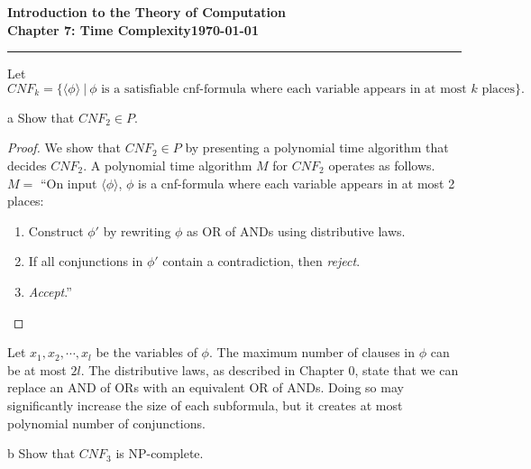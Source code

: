 \documentclass[11pt]{article}
\newcommand{\dated}{\today}
\begin{document}
\textbf{Introduction to the Theory of
Computation}\hfill\textbf{\myname}\\[0.01in]
\textbf{Chapter 7: Time Complexity}\hfill\textbf{\dated}\\
\smallskip\hrule\bigskip

\begin{problem}{7.24}
Let
\[
CNF_k = \{\langle \phi \rangle \ | \ \phi \text{ is a satisfiable cnf-formula where each variable appears in at most } k \text{ places}\}.
\]
\end{problem}

\begin{problem}[Part]{a}
Show that $CNF_2 \in P$.
\end{problem}

\begin{proof}
We show that $CNF_2 \in P$ by presenting a polynomial time algorithm that decides $CNF_2$. A polynomial time algorithm $M$ for $CNF_2$ operates as follows. \\

$M =$ \textquotedblleft On input $\langle \phi \rangle$, $\phi$ is a cnf-formula where each variable appears in at most 2 places:
\begin{enumerate}
\item Construct $\phi'$ by rewriting $\phi$ as OR of ANDs using distributive laws.
\item If all conjunctions in $\phi'$ contain a contradiction, then \textit{reject}.
\item \textit{Accept}.\textquotedblright
\end{enumerate}
\end{proof}

Let $x_1, x_2, \cdots, x_l$ be the variables of $\phi$. The maximum number of clauses in $\phi$ can be at most $2l$. The distributive laws, as described in Chapter 0, state that we can replace an AND of ORs with an equivalent OR of ANDs. Doing so may significantly increase the size of each subformula, but it creates at most polynomial number of conjunctions.

\begin{problem}[Part]{b}
Show that $CNF_3$ is NP-complete.
\end{problem}
\end{document}
